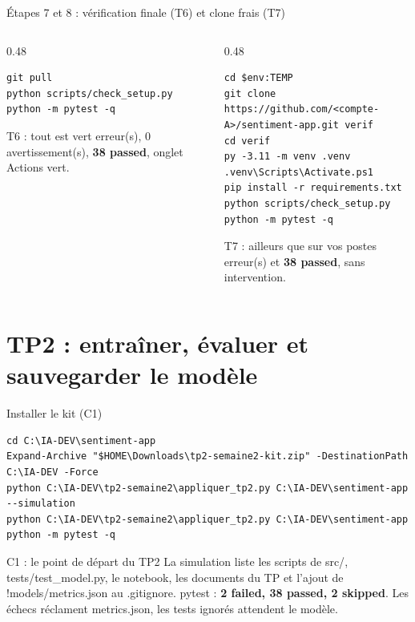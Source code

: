 \documentclass[aspectratio=169,11pt]{beamer}
\newcommand{\co}[1]{{\ttfamily\hyphenchar\font=45\relax #1}}
\begin{document}
\begin{frame}[fragile]{Étapes 7 et 8 : vérification finale (T6) et clone frais (T7)}
\begin{columns}[T]
\begin{column}{0.48\textwidth}
\begin{lstlisting}
git pull
python scripts/check_setup.py
python -m pytest -q
\end{lstlisting}
\begin{exampleblock}{T6 : tout est vert}
\co{0 erreur(s), 0 avertissement(s)}, \textbf{38 passed}, onglet Actions vert.
\end{exampleblock}
\end{column}
\begin{column}{0.48\textwidth}
\begin{lstlisting}
cd $env:TEMP
git clone https://github.com/<compte-A>/sentiment-app.git verif
cd verif
py -3.11 -m venv .venv
.venv\Scripts\Activate.ps1
pip install -r requirements.txt
python scripts/check_setup.py
python -m pytest -q
\end{lstlisting}
\begin{exampleblock}{T7 : ailleurs que sur vos postes}
\co{0 erreur(s)} et \textbf{38 passed}, sans intervention.
\end{exampleblock}
\end{column}
\end{columns}
\end{frame}

\section{TP2 : entraîner, évaluer et sauvegarder le modèle}

\begin{frame}[fragile]{Installer le kit (C1)}
\begin{lstlisting}
cd C:\IA-DEV\sentiment-app
Expand-Archive "$HOME\Downloads\tp2-semaine2-kit.zip" -DestinationPath C:\IA-DEV -Force
python C:\IA-DEV\tp2-semaine2\appliquer_tp2.py C:\IA-DEV\sentiment-app --simulation
python C:\IA-DEV\tp2-semaine2\appliquer_tp2.py C:\IA-DEV\sentiment-app
python -m pytest -q
\end{lstlisting}
\begin{exampleblock}{C1 : le point de départ du TP2}
La simulation liste les scripts de \co{src/}, \co{tests/test\_model.py}, le notebook, les documents du TP et
l'ajout de \co{!models/metrics.json} au \co{.gitignore}. pytest : \textbf{2 failed, 38 passed, 2 skipped}.
Les échecs réclament \co{metrics.json}, les tests ignorés attendent le modèle.
\end{exampleblock}
\end{frame}
\end{document}
